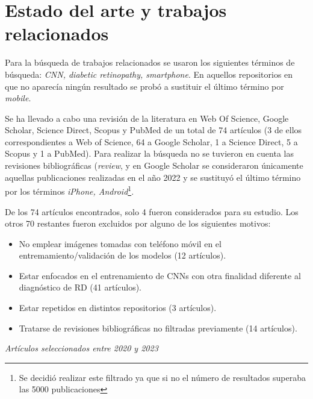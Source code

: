 \titlespacing{\section}{0pt}{0.25cm}{0.15cm}
\section{Estado del arte y trabajos relacionados}

Para la búsqueda de trabajos relacionados se usaron los siguientes términos de búsqueda: \textit{CNN, diabetic retinopathy, smartphone}. En aquellos repositorios en que no aparecía ningún resultado se probó a sustituir el último término por \textit{mobile}.

Se ha llevado a cabo una revisión de la literatura en Web Of Science, Google Scholar, Science Direct, Scopus y PubMed de un total de 74 artículos (3 de ellos correspondientes a Web of Science, 64 a Google Scholar, 1 a Science Direct, 5 a Scopus y 1 a PubMed). Para realizar la búsqueda no se tuvieron en cuenta las revisiones bibliográficas (\textit{review}, y en Google Scholar se consideraron únicamente aquellas publicaciones realizadas en el año 2022 y se sustituyó el último término por los términos \textit{iPhone, Android}\footnote{Se decidió realizar este filtrado ya que si no el número de resultados superaba las 5000 publicaciones}.

De los 74 artículos encontrados, solo 4 fueron considerados para su estudio. Los otros 70 restantes fueron excluidos por alguno de los siguientes motivos:

\begin{itemize} [itemsep=0.25em]
    \item No emplear imágenes tomadas con teléfono móvil en el entremamiento/validación de los modelos (12 artículos).
    \item Estar enfocados en el entrenamiento de CNNs con otra finalidad diferente al diagnóstico de RD (41 artículos).
    \item Estar repetidos en distintos repositorios (3 artículos).
    \item Tratarse de revisiones bibliográficas no filtradas previamente (14 artículos).
\end{itemize}

\textit{Artículos seleccionados entre 2020 y 2023}

